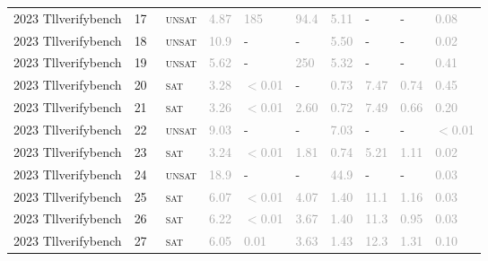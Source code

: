 \begin{center}
{\begin{longtable}{@{}llllllllll@{}}
2023 Tllverifybench & 17 & ~\textsc{unsat} & \textcolor{darkgray}{4.87} & \textcolor{darkgray}{185} & \textcolor{darkgray}{94.4} & \textcolor{darkgray}{5.11} & - & - & \textcolor{darkgray}{0.08} \\
2023 Tllverifybench & 18 & ~\textsc{unsat} & \textcolor{darkgray}{10.9} & - & - & \textcolor{darkgray}{5.50} & - & - & \textcolor{darkgray}{0.02} \\
2023 Tllverifybench & 19 & ~\textsc{unsat} & \textcolor{darkgray}{5.62} & - & \textcolor{darkgray}{250} & \textcolor{darkgray}{5.32} & - & - & \textcolor{darkgray}{0.41} \\
2023 Tllverifybench & 20 & ~\textsc{sat} & \textcolor{darkgray}{3.28} & \textcolor{darkgray}{$<$0.01} & - & \textcolor{darkgray}{0.73} & \textcolor{darkgray}{7.47} & \textcolor{darkgray}{0.74} & \textcolor{darkgray}{0.45} \\
2023 Tllverifybench & 21 & ~\textsc{sat} & \textcolor{darkgray}{3.26} & \textcolor{darkgray}{$<$0.01} & \textcolor{darkgray}{2.60} & \textcolor{darkgray}{0.72} & \textcolor{darkgray}{7.49} & \textcolor{darkgray}{0.66} & \textcolor{darkgray}{0.20} \\
2023 Tllverifybench & 22 & ~\textsc{unsat} & \textcolor{darkgray}{9.03} & - & - & \textcolor{darkgray}{7.03} & - & - & \textcolor{darkgray}{$<$0.01} \\
2023 Tllverifybench & 23 & ~\textsc{sat} & \textcolor{darkgray}{3.24} & \textcolor{darkgray}{$<$0.01} & \textcolor{darkgray}{1.81} & \textcolor{darkgray}{0.74} & \textcolor{darkgray}{5.21} & \textcolor{darkgray}{1.11} & \textcolor{darkgray}{0.02} \\
2023 Tllverifybench & 24 & ~\textsc{unsat} & \textcolor{darkgray}{18.9} & - & - & \textcolor{darkgray}{44.9} & - & - & \textcolor{darkgray}{0.03} \\
2023 Tllverifybench & 25 & ~\textsc{sat} & \textcolor{darkgray}{6.07} & \textcolor{darkgray}{$<$0.01} & \textcolor{darkgray}{4.07} & \textcolor{darkgray}{1.40} & \textcolor{darkgray}{11.1} & \textcolor{darkgray}{1.16} & \textcolor{darkgray}{0.03} \\
2023 Tllverifybench & 26 & ~\textsc{sat} & \textcolor{darkgray}{6.22} & \textcolor{darkgray}{$<$0.01} & \textcolor{darkgray}{3.67} & \textcolor{darkgray}{1.40} & \textcolor{darkgray}{11.3} & \textcolor{darkgray}{0.95} & \textcolor{darkgray}{0.03} \\
2023 Tllverifybench & 27 & ~\textsc{sat} & \textcolor{darkgray}{6.05} & \textcolor{darkgray}{0.01} & \textcolor{darkgray}{3.63} & \textcolor{darkgray}{1.43} & \textcolor{darkgray}{12.3} & \textcolor{darkgray}{1.31} & \textcolor{darkgray}{0.10} \\

\end{longtable}}
\end{center}
